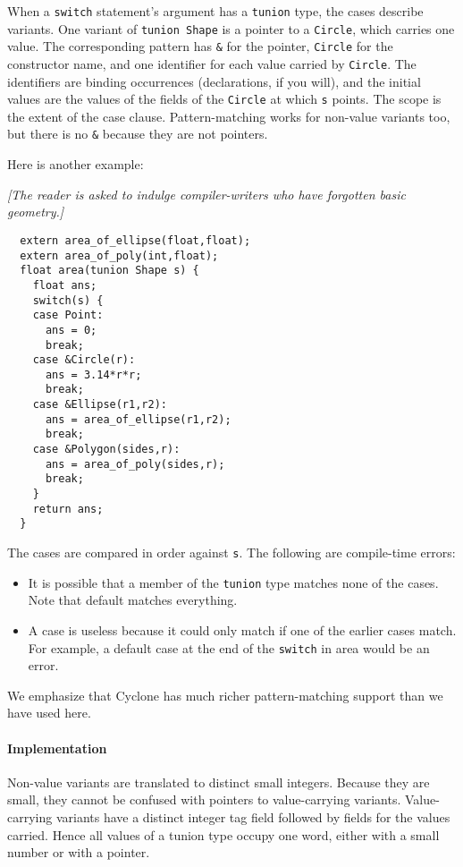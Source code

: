 When a \texttt{switch} statement's argument has a \texttt{tunion} type,
the cases describe variants.  One variant of \texttt{tunion Shape} is a
pointer to a \texttt{Circle}, which carries one value.  The
corresponding pattern has \texttt{\&} for the pointer, \texttt{Circle} for
the constructor name, and one identifier for each value carried by
\texttt{Circle}.  The identifiers are binding occurrences (declarations,
if you will), and the initial values are the values of the fields of
the \texttt{Circle} at which \texttt{s} points.  The scope is the extent
of the case clause.  Pattern-matching works for non-value variants
too, but there is no \texttt{\&} because they are not pointers.

Here is another example:

\textit{[The reader is asked to indulge compiler-writers who have
  forgotten basic geometry.]}
\begin{verbatim}
  extern area_of_ellipse(float,float);
  extern area_of_poly(int,float);
  float area(tunion Shape s) {
    float ans;
    switch(s) {
    case Point:
      ans = 0;
      break;
    case &Circle(r):
      ans = 3.14*r*r;
      break;
    case &Ellipse(r1,r2):
      ans = area_of_ellipse(r1,r2);
      break;
    case &Polygon(sides,r):
      ans = area_of_poly(sides,r);
      break;
    }
    return ans;
  }
\end{verbatim}

The cases are compared in order against \texttt{s}.  The following are
compile-time errors:
\begin{itemize}
\item It is possible that a member of the \texttt{tunion} type matches
  none of the cases.  Note that default matches everything.
\item A case is useless because it could only match if one of the
  earlier cases match.  For example, a default case at the end of the
  \texttt{switch} in area would be an error.
\end{itemize}

We emphasize that Cyclone has much richer pattern-matching support
than we have used here.

\paragraph{Implementation}
Non-value variants are translated to distinct small integers.  Because
they are small, they cannot be confused with pointers to
value-carrying variants.  Value-carrying variants have a distinct
integer tag field followed by fields for the values carried.  Hence
all values of a tunion type occupy one word, either with a small
number or with a pointer.

